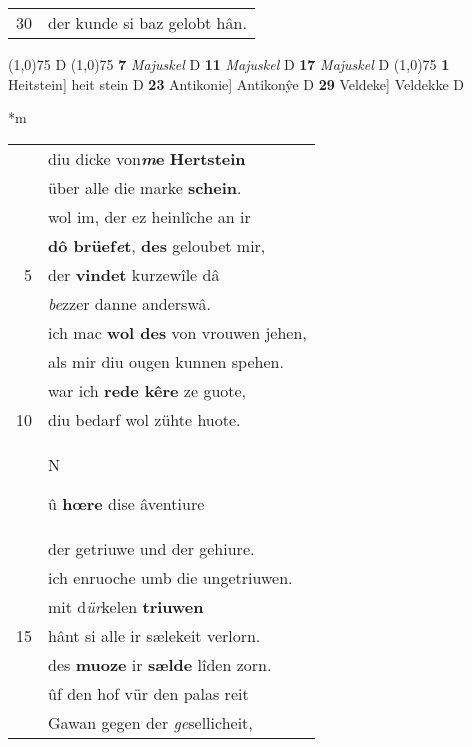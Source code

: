 \documentclass[8pt,a4paper,notitlepage]{article}
\begin{document}
\begin{table}[ht]
\begin{minipage}[t]{0.5\linewidth}
\begin{tabular}{rl}
30 & der kunde si baz gelobt hân.\\ 
\end{tabular}
\scriptsize
\line(1,0){75} \newline
D \newline
\line(1,0){75} \newline
\textbf{7} \textit{Majuskel} D  \textbf{11} \textit{Majuskel} D  \textbf{17} \textit{Majuskel} D  \newline
\line(1,0){75} \newline
\textbf{1} Heitstein] heit stein D \textbf{23} Antikonie] Antikonŷe D \textbf{29} Veldeke] Veldekke D \newline
\end{minipage}
\hspace{0.5cm}
\begin{minipage}[t]{0.5\linewidth}
\small
\begin{center}*m
\end{center}
\begin{tabular}{rl}
 & diu dicke von\textbf{\textit{m}e} \textbf{Hertstein}\\ 
 & über alle die marke \textbf{schein}.\\ 
 & wol im, der ez heinlîche an ir\\ 
 & \textbf{dô brüef\textit{e}t}, \textbf{des} geloubet mir,\\ 
5 & der \textbf{vindet} kurzewîle dâ\\ 
 & \textit{be}zzer danne anderswâ.\\ 
 & ich mac \textbf{wol des} von vrouwen jehen,\\ 
 & als mir diu ougen kunnen spehen.\\ 
 & war ich \textbf{rede kêre} ze guote,\\ 
10 & diu bedarf wol zühte huote.\\ 
 & \begin{large}N\end{large}û \textbf{hœre} dise âventiure\\ 
 & der getriuwe und der gehiure.\\ 
 & ich enruoche umb die ungetriuwen.\\ 
 & mit d\textit{ür}kelen \textbf{triuwen}\\ 
15 & hânt si alle ir sælekeit verlorn.\\ 
 & des \textbf{muoze} ir \textbf{sælde} lîden zorn.\\ 
 & ûf den hof vür den palas reit\\ 
 & Gawan gegen der \textit{ge}sellicheit,\\ 

\end{tabular}
\end{minipage}
\end{table}
\end{document}
